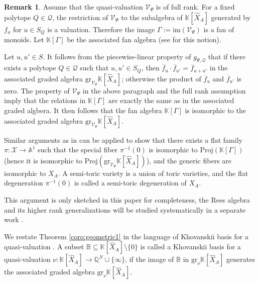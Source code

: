 \documentclass[12pt, a4article]{amsart}   	%
\numberwithin{equation}{section}
\theoremstyle{plain}
\theoremstyle{definition}
\newtheorem{remark}[theorem]{Remark}
\begin{document}
\begin{remark}
Assume that the quasi-valuation $\mathcal{V}_\Psi$ is of full rank. For a fixed polytope $Q\in\mathcal{Q}$, the restriction of $\mathcal{V}_\Psi$ to the subalgebra of $\mathbb{K}[\hat{X}_A]$ generated by $f_u$ for $u\in S_Q$ is a valuation. Therefore the image $\Gamma:=\mathrm{im}(\mathcal{V}_\Psi)$ is a fan of monoids. Let $\mathbb{K}[\Gamma]$ be the associated fan algebra (see \cite{CFL1} for this notion). 

Let $u,u'\in S$. It follows from the piecewise-linear property of $g_{\Psi,\mathcal{Q}}$ that if there exists a polytope $Q\in\mathcal{Q}$ such that $u,u'\in S_Q$, then $\overline{f}_u\cdot \overline{f}_{u'}=\overline{f}_{u+u'}$ in the associated graded algebra $\mathrm{gr}_{\mathcal{V}_\Psi}\mathbb{K}[\hat{X}_A]$; otherwise the product of $\overline{f}_u$ and $\overline{f}_{u'}$ is zero. The property of $\mathcal{V}_\Psi$ in the above paragraph and the full rank assumption imply that the relations in $\mathbb{K}[\Gamma]$ are exactly the same as in the associated graded algbera. It then follows that the fan algebra $\mathbb{K}[\Gamma]$ is isomorphic to the associated graded algebra $\mathrm{gr}_{\mathcal{V}_\Psi}\mathbb{K}[\hat{X}_A]$.

Similar arguments as in \cite[Proposition 3]{And} can be applied to show that there exists a flat family $\pi:\mathcal{X}\to\mathbb{A}^1$ such that the special fiber $\pi^{-1}(0)$ is isomorphic to $\mathrm{Proj}(\mathbb{K}[\Gamma])$ (hence it is isomorphic to $\mathrm{Proj}(\mathrm{gr}_{\mathcal{V}_\Psi}\mathbb{K}[\hat{X}_A])$), and the generic fibers are isomorphic to $X_A$. A semi-toric variety is a union of toric varieties, and the flat degeneration $\pi^{-1}(0)$ is called a semi-toric degeneration of $X_A$.

This argument is only sketched in this paper for completeness, the Rees algebra and its higher rank generalizations will be studied systematically in a separate work \cite{CCFL3}.
\end{remark}





We restate Theorem \ref{coro:geometric1} in the language of Khovanskii basis for a quasi-valuation \cite[Section 15.5]{CFL1}.
A subset $\mathbb{B}\subseteq\mathbb{K}[\hat X_A]\setminus\{0\}$ is called a Khovanskii basis for a quasi-valuation $\nu:\mathbb{K}[\hat X_A]\to\mathbb{Q}^N\cup\{\infty\}$, if the image of $\mathbb{B}$ in $\mathrm{gr}_{\nu}\mathbb{K}[\hat X_A]$ generates the associated graded algebra $\mathrm{gr}_{\nu}\mathbb{K}[\hat X_A]$.
\end{document}
